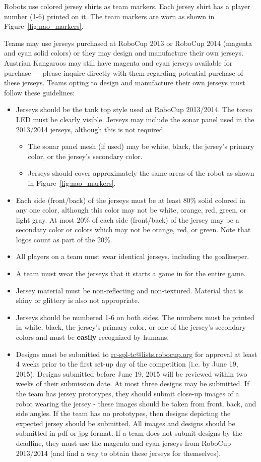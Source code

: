 \documentclass[12pt]{article}
\begin{document}
Robots use colored jersey shirts as team markers. Each jersey shirt has a player number (1-6) printed on it.  The team markers are worn as shown in Figure~\ref{fig:nao_markers}.

Teams may use jerseys purchased at RoboCup 2013 or RoboCup 2014 (magenta and cyan solid colors) or they may design and manufacture their own jerseys.  Austrian Kangaroos may still have magenta and cyan jerseys available for purchase --- please inquire directly with them regarding potential purchase of these jerseys.  Teams opting to design and manufacture their own jerseys must follow these guidelines:
\begin{itemize}
\item Jerseys should be the tank top style used at RoboCup 2013/2014.  The torso LED must be clearly visible.  Jerseys may include the sonar panel used in the 2013/2014 jerseys, although this is not required.
	\begin{itemize}
	\item The sonar panel mesh (if used) may be white, black, the jersey's primary color, or the jersey's secondary color.
	\item Jerseys should cover approximately the same areas of the robot as shown in Figure~\ref{fig:nao_markers}.
	\end{itemize}
\item Each side (front/back) of the jerseys must be at least 80\% solid colored in any one color, although this color may not be white, orange, red, green, or light gray.  At most 20\% of each side (front/back) of the jersey may be a secondary color or colors which may not be orange, red, or green.  Note that logos count as part of the 20\%.
\item All players on a team must wear identical jerseys, including the goalkeeper.
\item A team must wear the jerseys that it starts a game in for the entire game.
\item Jersey material must be non-reflecting and non-textured.  Material that is shiny or glittery is also not appropriate.
\item Jerseys should be numbered 1-6 on both sides.  The numbers must be printed in white, black, the jersey's primary color, or one of the jersey's secondary colors and must be {\bf easily} recognized by humans.
\item Designs must be submitted to \url{rc-spl-tc@lists.robocup.org} for approval at least 4 weeks prior to the first set-up day of the competition (i.e. by June 19, 2015).  Designs submitted before June 19, 2015 will be reviewed within two weeks of their submission date.  At most three designs may be submitted. If the team has jersey prototypes, they should submit close-up images of a robot wearing the jersey - these images should be taken from front, back, and side angles.  If the team has no prototypes, then designs depicting the expected jersey should be submitted.  All images and designs should be submitted in pdf or jpg format.  If a team does not submit designs by the deadline, they must use the magenta and cyan jerseys from RoboCup 2013/2014 (and find a way to obtain these jerseys for themselves).
\end{itemize}
\end{document}
